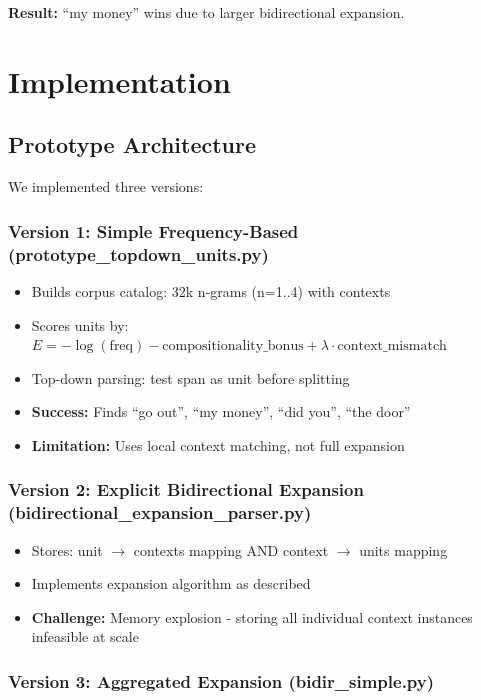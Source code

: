 \documentclass[11pt]{article}
\begin{document}
\textbf{Result:} ``my money'' wins due to larger bidirectional expansion.

\section{Implementation}

\subsection{Prototype Architecture}

We implemented three versions:

\subsubsection{Version 1: Simple Frequency-Based (prototype\_topdown\_units.py)}

\begin{itemize}
\item Builds corpus catalog: 32k n-grams (n=1..4) with contexts
\item Scores units by: $E = -\log(\text{freq}) - \text{compositionality\_bonus} + \lambda \cdot \text{context\_mismatch}$
\item Top-down parsing: test span as unit before splitting
\item \textbf{Success:} Finds ``go out'', ``my money'', ``did you'', ``the door''
\item \textbf{Limitation:} Uses local context matching, not full expansion
\end{itemize}

\subsubsection{Version 2: Explicit Bidirectional Expansion (bidirectional\_expansion\_parser.py)}

\begin{itemize}
\item Stores: unit $\to$ contexts mapping AND context $\to$ units mapping
\item Implements expansion algorithm as described
\item \textbf{Challenge:} Memory explosion - storing all individual context instances infeasible at scale
\end{itemize}

\subsubsection{Version 3: Aggregated Expansion (bidir\_simple.py)}
\end{document}
